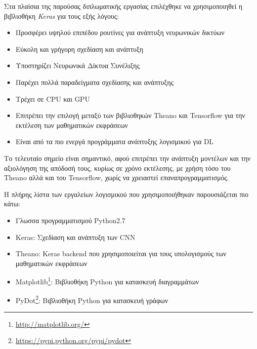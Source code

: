 Στα πλαίσια της παρούσας διπλωματικής εργασίας επιλέχθηκε να χρησιμοποιηθεί
η βιβλιοθήκη \emph{Keras} για τους εξής λόγους:
\begin{itemize}
  \item{Προσφέρει υψηλού επιπέδου ρουτίνες για ανάπτυξη νευρωνικών δικτύων}
  \item{Εύκολη και γρήγορη σχεδίαση και ανάπτυξη}
  \item{Υποστηρίζει Νευρωνικά Δίκτυα Συνέλιξης}
  \item{Παρέχει πολλά παραδείγματα σχεδίασης και ανάπτυξης}
  \item{Τρέχει σε CPU και GPU}
  \item{Επιτρέπει την επιλογή μεταξύ των βιβλιοθηκών Theano και Tensorflow
    για την εκτέλεση των μαθηματικών εκφράσεων}
  \item{Είναι από τα πιο ενεργά προγράμματα ανάπτυξης λογισμικού για DL}
\end{itemize}

Το τελευταίο σημείο είναι σημαντικό, αφού επιτρέπει την ανάπτυξη μοντέλων και
την αξιολόγηση της απόδοσή τους, κυρίως σε χρόνο εκτέλεσης,
με χρήση τόσο του Theano αλλά και του Tensorflow, χωρίς να χρειαστεί
επαναπρογραμματισμός.

Η πλήρης λίστα των εργαλείων λογισμικού που χρησιμοποιήθηκαν παρουσιάζεται πιο κάτω:
\begin{itemize}
  \item{Γλωσσα προγραμματισμού Python2.7}
  \item{Keras: Σχεδίαση και ανάπτυξη των CNN}
  \item{Theano: Keras backend που χρησιμοποιείται για τους υπολογισμούς των μαθηματικών εκφράσεων}
  \item{Matplotlib\footnote{\url{http://matplotlib.org/}}: Βιβλιοθήκη Python για κατασκευή διαγραμμάτων}
  \item{PyDot\footnote{\url{https://pypi.python.org/pypi/pydot}}: Βιβλιοθήκη Python για κατασκευή γράφων}
\end{itemize}

